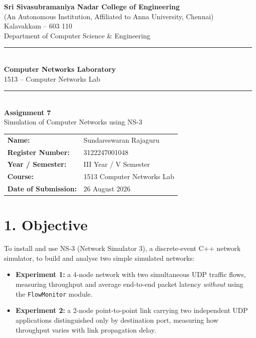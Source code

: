 \documentclass[11pt]{article}
\title{\vspace{-2cm}}
\date{}
\begin{document}
\begin{titlepage}
\centering
\vspace*{1cm}
{\large \textbf{Sri Sivasubramaniya Nadar College of Engineering}}\\
{\small (An Autonomous Institution, Affiliated to Anna University, Chennai)}\\
{\small Kalavakkam -- 603 110}\\[0.3cm]
{\small Department of Computer Science \& Engineering}\\[1.5cm]

\rule{\linewidth}{0.5mm}\\[0.4cm]
{\LARGE \textbf{Computer Networks Laboratory}}\\[0.3cm]
{\Large 1513 -- Computer Networks Lab}\\[0.4cm]
\rule{\linewidth}{0.5mm}\\[1.5cm]

{\huge \textbf{Assignment 7}}\\[0.4cm]
{\Large Simulation of Computer Networks using NS-3}\\[2cm]

\begin{center}
\begin{tabular}{ll}
\textbf{Name:} & Sundareswaran Rajaguru \\[0.2cm]
\textbf{Register Number:} & 3122247001048 \\[0.2cm]
\textbf{Year / Semester:} & III Year / V Semester \\[0.2cm]
\textbf{Course:} & 1513 Computer Networks Lab \\[0.2cm]
\textbf{Date of Submission:} & 26 August 2026 \\[0.2cm]
\end{tabular}
\end{center}

\vfill
\end{titlepage}

\section*{1. Objective}
To install and use NS-3 (Network Simulator 3), a discrete-event C++ network
simulator, to build and analyse two simple simulated networks:
\begin{itemize}
  \item \textbf{Experiment 1:} a 4-node network with two simultaneous UDP
        traffic flows, measuring throughput and average end-to-end packet
        latency \emph{without} using the \texttt{FlowMonitor} module.
  \item \textbf{Experiment 2:} a 2-node point-to-point link carrying two
        independent UDP applications distinguished only by destination
        port, measuring how throughput varies with link propagation delay.
\end{itemize}
\end{document}
